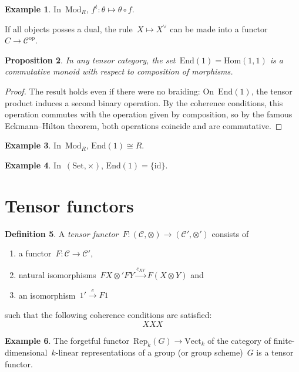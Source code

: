 \documentclass[a4paper,english,12pt]{scrartcl}
\theoremstyle{definition}
\newtheorem{defn}{Definition}[section]
\newtheorem{ex}[defn]{Example}
\theoremstyle{plain}
\newtheorem{prop}[defn]{Proposition}
\theoremstyle{remark}
\newcommand{\C}{\mathcal{C}}
\newcommand{\id}{\mathrm{id}}
\newcommand{\op}{\mathrm{op}}
\newcommand{\xra}[1]{\xrightarrow{#1}}
\renewcommand{\_}{\mathpunct{.}\,}
\newcommand{\?}{\,{:}\,}
\newcommand{\Mod}{\mathrm{Mod}}
\newcommand{\Set}{\mathrm{Set}}
\newcommand{\Vect}{\mathrm{Vect}}
\renewcommand{\hom}{\mathrm{Hom}}
\newcommand{\End}{\mathrm{End}}
\newcommand{\Rep}{\mathrm{Rep}}
\begin{document}
\begin{ex}In~$\Mod_R$, $f^t : \theta \mapsto \theta \circ f$.\end{ex}

If all objects posses a dual, the rule~$X \mapsto X^\vee$ can be made into a
functor~$C \to \C^\op$.

\begin{prop}In any tensor category, the set~$\End(1) = \hom(1,1)$ is a
commutative monoid with respect to composition of morphisms.\end{prop}
\begin{proof}The result holds even if there were no braiding:
On~$\End(1)$, the tensor product induces a second binary operation. By the
coherence conditions, this operation commutes with the operation given by
composition, so by the famous Eckmann--Hilton theorem, both operations coincide
and are commutative.\end{proof}

\begin{ex}In~$\Mod_R$, $\End(1) \cong R$.\end{ex}

\begin{ex}In~$(\Set,\times)$, $\End(1) = \{\id\}$.\end{ex}


\section{Tensor functors}

\begin{defn}A \emph{tensor functor}~$F : (\C,\otimes) \to (\C',\otimes')$
consists of
\begin{enumerate}
\item a functor~$F : \C \to \C'$,
\item natural isomorphisms~$FX \otimes' FY \xra{c_{XY}} F(X \otimes Y)$ and
\item an isomorphism~$1' \xra{e} F1$
\end{enumerate}
such that the following coherence conditions are satisfied:
\[ XXX \]
\end{defn}

\begin{ex}The forgetful functor~$\Rep_k(G) \to \Vect_k$ of the category
of finite-dimensional~$k$-linear representations of a group (or group
scheme)~$G$ is a tensor functor.\end{ex}
\end{document}
